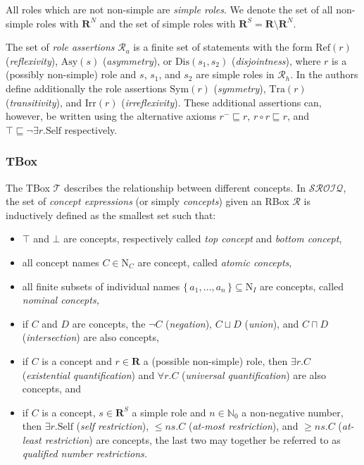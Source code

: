 All roles which are not non-simple are \emph{simple roles}. We denote the set of all non-simple roles with $\mathbf{R}^N$ and the set of simple roles with $\mathbf{R}^S = \mathbf{R} \setminus \mathbf{R}^N$.

The set of \emph{role assertions} $\mathcal{R}_a$ is a finite set of statements with the form $\mathrm{Ref}(r)$ (\emph{reflexivity}), $\mathrm{Asy}(s)$ (\emph{asymmetry}), or $\mathrm{Dis}(s_1, s_2)$ (\emph{disjointness}), where $r$ is a (possibly non-simple) role and $s$, $s_1$, and $s_2$ are simple roles in $\mathcal{R}_h$. In \cite{horrocks2006even} the authors define additionally the role assertions $\mathrm{Sym}(r)$ (\emph{symmetry}), $\mathrm{Tra}(r)$ (\emph{transitivity}), and $\mathrm{Irr}(r)$ (\emph{irreflexivity}). These additional assertions can, however, be written using the alternative axioms $r^- \sqsubseteq r$, $r \circ r \sqsubseteq r$, and $\top \sqsubseteq \lnot \exists r . \mathrm{Self}$ respectively.

\subsubsection{TBox}

The TBox $\mathcal{T}$ describes the relationship between different concepts. In $\mathcal{SROIQ}$, the set of \emph{concept expressions} (or simply \emph{concepts}) given an RBox $\mathcal{R}$ is inductively defined as the smallest set such that:

\begin{itemize}
    \item $\top$ and $\bot$ are concepts, respectively called \emph{top concept} and \emph{bottom concept},
    \item all concept names $C \in \mathrm{N}_C$ are concept, called \emph{atomic concepts},
    \item all finite subsets of individual names $\{ \, a_1, \dots, a_n \, \} \subseteq \mathrm{N}_I$ are concepts, called \emph{nominal concepts,}
    \item if $C$ and $D$ are concepts, the $\lnot C$ (\emph{negation}), $C \sqcup D$ (\emph{union}), and $C \sqcap D$ (\emph{intersection}) are also concepts,
    \item if $C$ is a concept and $r \in \mathbf{R}$ a (possible non-simple) role, then $\exists r . C$ (\emph{existential quantification}) and $\forall r . C$ (\emph{universal quantification}) are also concepts, and
    \item if $C$ is a concept, $s \in \mathbf{R}^S$ a simple role and $n \in \mathbb{N}_0$ a non-negative number, then $\exists r . \mathrm{Self}$ (\emph{self restriction}), $\leq n s . C$ (\emph{at-most restriction}), and $\geq n s. C$ (\emph{at-least restriction}) are concepts, the last two may together be referred to as \emph{qualified number restrictions.}
\end{itemize}

